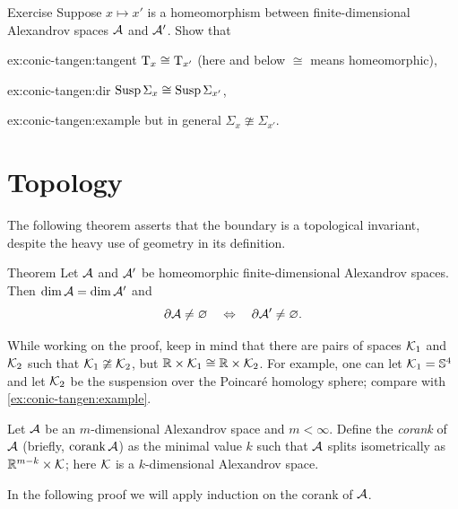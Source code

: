 \begin{thm}[!]{Exercise}\label{ex:conic-tangent}
Suppose $x\mapsto x'$ is a homeomorphism between finite-dimensional Alexandrov spaces $\mathcal{A}$ and $\mathcal{A}'$. Show that 

\begin{subthm}{ex:conic-tangen:tangent}
$\mathrm{T}_x\cong \mathrm{T}_{x'}$ (here and below $\cong$ means homeomorphic),
\end{subthm}

\begin{subthm}{ex:conic-tangen:dir}
$\mathop{\rm Susp}\nolimits\Sigma_x\cong \mathop{\rm Susp}\nolimits\Sigma_{x'}$,
\end{subthm}

\begin{subthm}{ex:conic-tangen:example}
but in general $\Sigma_x\ncong\Sigma_{x'}$.
\end{subthm}

\end{thm}


\section{Topology}

The following theorem asserts that the boundary is a topological invariant, despite the heavy use of geometry in its definition.

\begin{thm}{Theorem}\label{thm:top-bry}
Let $\mathcal{A}$ and $\mathcal{A}'$ be homeomorphic finite-dimensional Alexandrov spaces.
Then $\operatorname{\rm dim}\nolimits \mathcal{A}=\operatorname{\rm dim}\nolimits\mathcal{A}'$ and
\[\partial\mathcal{A}\ne \varnothing
\quad\Leftrightarrow\quad
\partial\mathcal{A}'\ne \varnothing.
\]
\end{thm}


While working on the proof, keep in mind that there are pairs of spaces $\mathcal{K}_1$ and $\mathcal{K}_2$ such that $\mathcal{K}_1\ncong \mathcal{K}_2$, but $\mathbb{R}\times \mathcal{K}_1\cong \mathbb{R}\times \mathcal{K}_2$.
For example, one can let $\mathcal{K}_1=\mathbb{S}^4$ and let $\mathcal{K}_2$ be the suspension over the Poincaré homology sphere; compare with \ref{ex:conic-tangen:example}.

Let $\mathcal{A}$ be an $m$-dimensional Alexandrov space and $m<\infty$.
Define the \emph{corank} of $\mathcal{A}$ (briefly, $\operatorname{\rm corank}\nolimits\mathcal{A}$) as the minimal value $k$ such that $\mathcal{A}$ splits isometrically as $\mathbb{R}^{m-k}\times \mathcal{K}$;
here $\mathcal{K}$ is a $k$-dimensional Alexandrov space.

In the following proof we will apply induction on the corank of $\mathcal{A}$.



